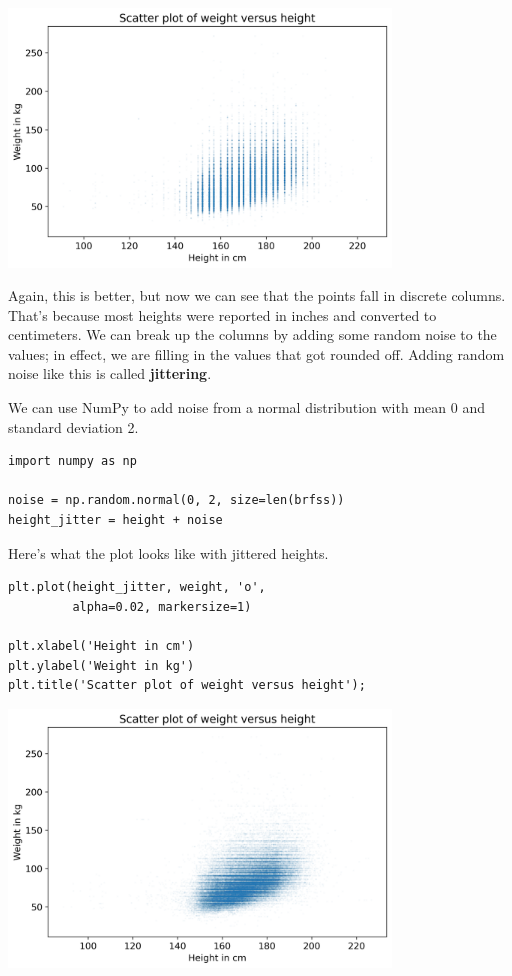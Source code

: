 \begin{center}
\includegraphics[width=4in]{chapters/09_relationships_files/09_relationships_16_0.png}
\end{center}

Again, this is better, but now we can see that the points fall in
discrete columns. That's because most heights were reported in inches
and converted to centimeters. We can break up the columns by adding some
random noise to the values; in effect, we are filling in the values that
got rounded off. Adding random noise like this is called
\textbf{jittering}.

We can use NumPy to add noise from a normal distribution with mean 0 and
standard deviation 2.

\begin{lstlisting}[]
import numpy as np

noise = np.random.normal(0, 2, size=len(brfss))
height_jitter = height + noise
\end{lstlisting}

Here's what the plot looks like with jittered heights.

\begin{lstlisting}[]
plt.plot(height_jitter, weight, 'o', 
         alpha=0.02, markersize=1)

plt.xlabel('Height in cm')
plt.ylabel('Weight in kg')
plt.title('Scatter plot of weight versus height');
\end{lstlisting}

\begin{center}
\includegraphics[width=4in]{chapters/09_relationships_files/09_relationships_20_0.png}
\end{center}

